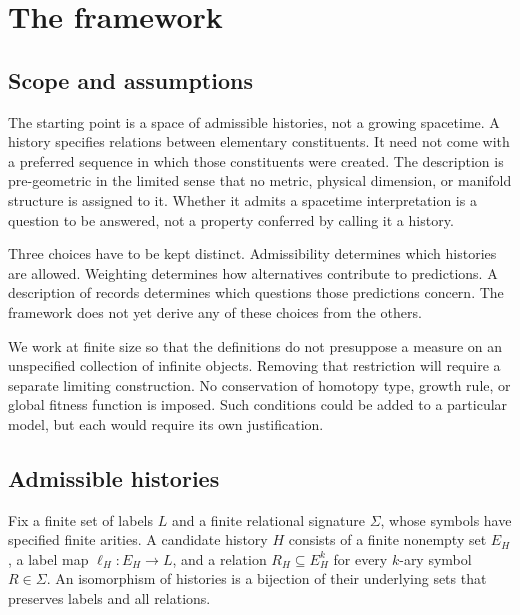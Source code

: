 \section{The framework}
\label{sec:framework}

\subsection{Scope and assumptions}

The starting point is a space of admissible histories, not a growing
spacetime. A history specifies relations between elementary constituents.
It need not come with a preferred sequence in which those constituents
were created. The description is pre-geometric in the limited sense that
no metric, physical dimension, or manifold structure is assigned to it.
Whether it admits a spacetime interpretation is a question to be answered,
not a property conferred by calling it a history.

Three choices have to be kept distinct. Admissibility determines which
histories are allowed. Weighting determines how alternatives contribute to
predictions. A description of records determines which questions those
predictions concern. The framework does not yet derive any of these choices
from the others.

We work at finite size so that the definitions do not presuppose a measure
on an unspecified collection of infinite objects. Removing that restriction
will require a separate limiting construction. No conservation of homotopy
type, growth rule, or global fitness function is imposed. Such conditions
could be added to a particular model, but each would require its own
justification.

\subsection{Admissible histories}
\label{sec:admissibility}

\begin{definition}
Fix a finite set of labels $L$ and a finite relational signature $\Sigma$,
whose symbols have specified finite arities. A candidate history $H$
consists of a finite nonempty set $E_H$, a label map $\ell_H:E_H\to L$, and
a relation $R_H\subseteq E_H^k$ for every $k$-ary symbol $R\in\Sigma$.
An isomorphism of histories is a bijection of their underlying sets that
preserves labels and all relations.
\end{definition}

